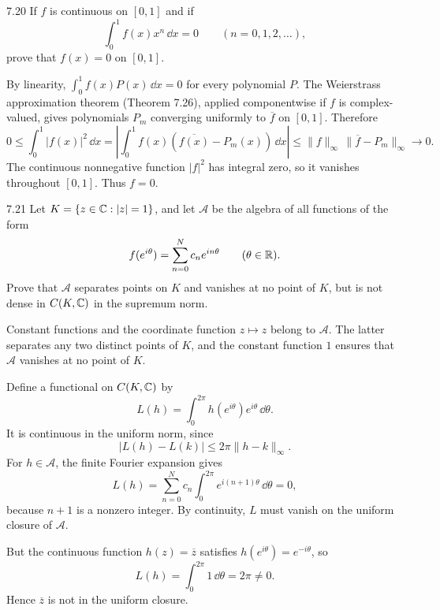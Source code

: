 \documentclass[11pt, oneside]{article}
\begin{document}
\begin{exercise}{7.20}
If $f$ is continuous on $[0, 1]$ and if
\[
 \int_0^1 f(x)x^n\,\dd x=0\qquad(n=0, 1, 2, \ldots),
\]
prove that $f(x)=0$ on $[0, 1]$.
\end{exercise}
\begin{solution}
By linearity, $\int_0^1 f(x)P(x)\,\dd x=0$ for every polynomial $P$. The Weierstrass approximation theorem (Theorem 7.26), applied componentwise if $f$ is complex-valued, gives polynomials $P_m$ converging uniformly to $\overline f$ on $[0, 1]$. Therefore
\[
 0\le\int_0^1|f(x)|^2\,\dd x
 =\left|\int_0^1 f(x)(\overline{f(x)}-P_m(x))\,\dd x\right|
 \le\|f\|_\infty\,\|\overline f-P_m\|_\infty\longrightarrow0.
\]
The continuous nonnegative function $|f|^2$ has integral zero, so it vanishes throughout $[0, 1]$. Thus $f=0$.
\end{solution}

\begin{exercise}{7.21}
Let $K=\{z\in\mathbb{C}:|z|=1\}$, and let $\mathcal{A}$ be the algebra of all functions of the form
\[
 f(e^{i\theta})=\sum_{n=0}^{N}c_ne^{in\theta}\qquad(\theta\in\mathbb{R}).
\]
Prove that $\mathcal{A}$ separates points on $K$ and vanishes at no point of $K$, but is not dense in $C(K, \mathbb{C})$ in the supremum norm.
\end{exercise}
\begin{solution}
Constant functions and the coordinate function $z\mapsto z$ belong to $\mathcal{A}$. The latter separates any two distinct points of $K$, and the constant function $1$ ensures that $\mathcal{A}$ vanishes at no point of $K$.

Define a functional on $C(K, \mathbb{C})$ by
\[
 L(h)=\int_0^{2\pi}h(e^{i\theta})e^{i\theta}\,\dd\theta.
\]
It is continuous in the uniform norm, since
\[
 |L(h)-L(k)|\le2\pi\|h-k\|_\infty.
\]
For $h\in\mathcal{A}$, the finite Fourier expansion gives
\[
 L(h)=\sum_{n=0}^{N}c_n\int_0^{2\pi}e^{i(n+1)\theta}\,\dd\theta=0,
\]
because $n+1$ is a nonzero integer. By continuity, $L$ must vanish on the uniform closure of $\mathcal{A}$.

But the continuous function $h(z)=\overline z$ satisfies $h(e^{i\theta})=e^{-i\theta}$, so
\[
 L(h)=\int_0^{2\pi}1\,\dd\theta=2\pi\ne0.
\]
Hence $\overline z$ is not in the uniform closure.
\end{solution}
\end{document}
